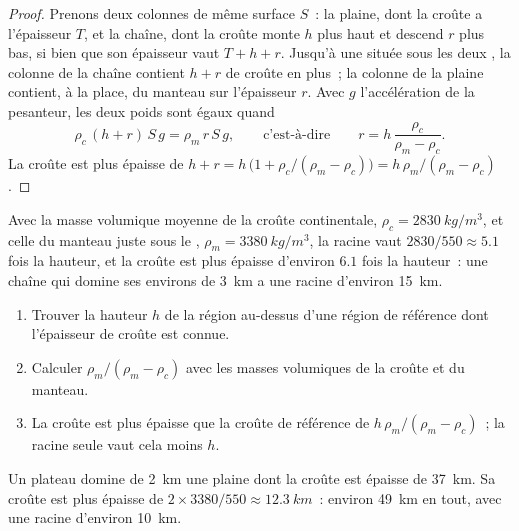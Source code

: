 \begin{proof}
Prenons deux colonnes de même surface $S$~: la plaine, dont la croûte a
l'épaisseur $T$, et la chaîne, dont la croûte monte $h$ plus haut et
descend $r$ plus bas, si bien que son épaisseur vaut $T + h + r$. Jusqu'à une
 située sous les deux , la colonne de la
chaîne contient $h + r$ de croûte en plus~; la colonne de la plaine
contient, à la place, du manteau sur l'épaisseur $r$. Avec $g$
l'accélération de la pesanteur, les deux poids sont égaux quand
\[
  \rho_c\,(h + r)\,S\,g = \rho_m\,r\,S\,g,
  \qquad\text{c'est-à-dire}\qquad
  r = h\,\frac{\rho_c}{\rho_m - \rho_c}.
\]
La croûte est plus épaisse de $h + r = h\,\bigl(1 + \rho_c/(\rho_m - \rho_c)\bigr)
= h\,\rho_m/(\rho_m - \rho_c)$.
\end{proof}

Avec la masse volumique moyenne de la croûte continentale, $\rho_c =
\qty{2830}{kg/m^3}$, et celle du manteau juste sous le , $\rho_m =
\qty{3380}{kg/m^3}$, la racine vaut $2830/550 \approx 5.1$ fois la hauteur,
et la croûte est plus épaisse d'environ $6.1$ fois la hauteur~: une chaîne
qui domine ses environs de \qty{3}{km} a une racine d'environ \qty{15}{km}.

\begin{method}\label{met:g11:lithosphere-asthenosphere:root}
\begin{enumerate}
  \item Trouver la hauteur $h$ de la région au-dessus d'une région de
        référence dont l'épaisseur de croûte est connue.
  \item Calculer $\rho_m/(\rho_m - \rho_c)$ avec les masses volumiques de la
        croûte et du manteau.
  \item La croûte est plus épaisse que la croûte de référence de
        $h\,\rho_m/(\rho_m -
        \rho_c)$~; la racine seule vaut cela moins $h$.
\end{enumerate}
\end{method}

\begin{example}\label{ex:g11:lithosphere-asthenosphere:plateau}
Un plateau domine de \qty{2}{km} une plaine dont la croûte est épaisse de
\qty{37}{km}. Sa croûte est plus épaisse de
$2 \times 3380/550 \approx \qty{12.3}{km}$~: environ \qty{49}{km} en tout, avec une racine d'environ
\qty{10}{km}.
\end{example}

